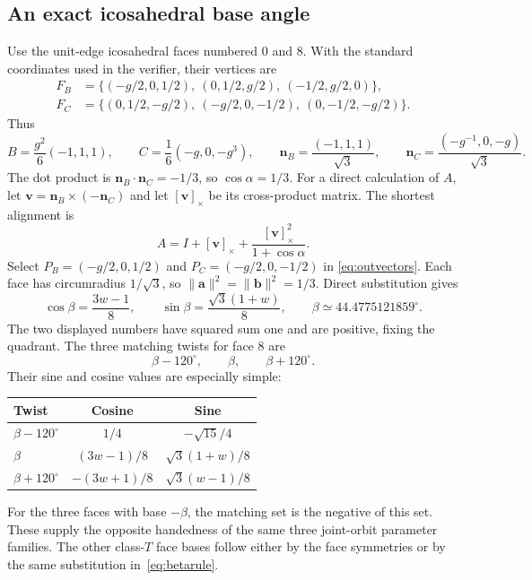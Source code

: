 \documentclass[11pt]{article}
\theoremstyle{definition}
\newcommand{\nb}{\mathbf n_B}
\newcommand{\nc}{\mathbf n_C}
\newcommand{\degc}{^{\circ}}
\begin{document}
\subsection{An exact icosahedral base angle}\label{sec:correction}
Use the unit-edge icosahedral faces numbered $0$ and $8$. With the standard
coordinates used in the verifier, their vertices are
\begin{align*}
 F_B&=\{(-g/2,0,1/2),\ (0,1/2,g/2),\ (-1/2,g/2,0)\},\\
 F_C&=\{(0,1/2,-g/2),\ (-g/2,0,-1/2),\ (0,-1/2,-g/2)\}.
\end{align*}
Thus
\begin{equation}\label{eq:icoBC}
 B=\frac{g^2}{6}(-1,1,1),\qquad
 C=\frac16(-g,0,-g^3),\qquad
 \nb=\frac{(-1,1,1)}{\sqrt3},\qquad
 \nc=\frac{(-g^{-1},0,-g)}{\sqrt3}.
\end{equation}
The dot product is $\nb\cdot\nc=-1/3$, so $\cos\alpha=1/3$.
For a direct calculation of $A$, let
$\mathbf v=\nb\times(-\nc)$ and let $[\mathbf v]_\times$ be its
cross-product matrix. The shortest alignment is
\begin{equation}\label{eq:shortmatrix}
 A=I+[\mathbf v]_\times+
 \frac{[\mathbf v]_\times^2}{1+\cos\alpha}.
\end{equation}
Select $P_B=(-g/2,0,1/2)$ and $P_C=(-g/2,0,-1/2)$ in
\eqref{eq:outvectors}. Each face has circumradius $1/\sqrt3$, so
$\|\mathbf a\|^2=\|\mathbf b\|^2=1/3$. Direct substitution gives
\begin{equation}\label{eq:betacos}
 \boxed{\cos\beta=\frac{3w-1}{8},\qquad
 \sin\beta=\frac{\sqrt3(1+w)}8,\qquad
 \beta\simeq44.4775121859\degc.}
\end{equation}
The two displayed numbers have squared sum one and are positive, fixing
the quadrant. The three matching twists for face $8$ are
\begin{equation}\label{eq:correctedtwists}
 \boxed{\beta-120\degc,\qquad\beta,\qquad\beta+120\degc.}
\end{equation}
Their sine and cosine values are especially simple:
\begin{center}
\renewcommand{\arraystretch}{1.4}
\begin{tabular}{@{}lcc@{}}
\toprule
Twist & Cosine & Sine\\
\midrule
$\beta-120\degc$ & $1/4$ & $-\sqrt{15}/4$\\
$\beta$ & $(3w-1)/8$ & $\sqrt3(1+w)/8$\\
$\beta+120\degc$ & $-(3w+1)/8$ & $\sqrt3(w-1)/8$\\
\bottomrule
\end{tabular}
\end{center}
For the three faces with base $-\beta$, the matching set is the negative
of this set. These supply the opposite handedness of the same three
joint-orbit parameter families. The other class-$T$ face bases follow either
by the face symmetries or by the same substitution in~\eqref{eq:betarule}.
\end{document}

